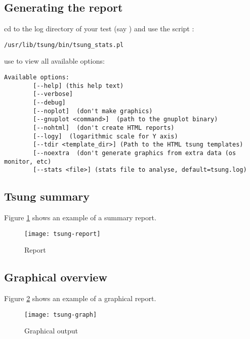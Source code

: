 \documentclass{TSUNG-en}
\begin{document}
\subsection{Generating the report}

cd to the log directory of your test (say
) and use the script
:

\begin{Verbatim}
/usr/lib/tsung/bin/tsung_stats.pl
\end{Verbatim}


use  to view all available options:

\begin{Verbatim}
Available options:
        [--help] (this help text)
        [--verbose]
        [--debug]
        [--noplot]  (don't make graphics)
        [--gnuplot <command>]  (path to the gnuplot binary)
        [--nohtml]  (don't create HTML reports)
        [--logy]  (logarithmic scale for Y axis)
        [--tdir <template_dir>] (Path to the HTML tsung templates)
        [--noextra  (don't generate graphics from extra data (os monitor, etc)
        [--stats <file>] (stats file to analyse, default=tsung.log)
\end{Verbatim}

\subsection{Tsung summary}
Figure \ref{fig:report} shows an example of a summary report.
\begin{figure}[htb]
  \begin{center}
    \texttt{[image: tsung-report]}
    \end{center}
      \caption{Report}
    \label{fig:report}
\end{figure}

\subsection{Graphical overview}

Figure \ref{fig:graph} shows an example of a graphical report.

\begin{figure}[htb]
  \begin{center}
    \texttt{[image: tsung-graph]}
    \end{center}
      \caption{Graphical output}
    \label{fig:graph}
\end{figure}
\end{document}
